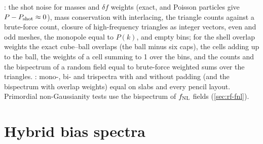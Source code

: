 \begin{validation}
: the shot noise for masses and $\delta f$ weights (exact, and Poisson particles give $P-P_{\rm shot}\approx0$), mass
conservation with interlacing, the triangle counts against a brute-force count, closure of high-frequency triangles as integer vectors, even and odd
meshes, the monopole equal to $P(k)$, and empty bins; for the shell overlap weights the exact cube--ball overlaps (the ball minus six caps), the
cells adding up to the ball, the weights of a cell summing to 1 over the bins, and the counts and the bispectrum of a random field equal to brute-force
weighted sums over the triangles. : mono-, bi- and trispectra with and without padding (and the bispectrum with
overlap weights) equal on slabs and every pencil layout. Primordial non-Gaussianity tests use the bispectrum of $f_{\rm NL}$ fields (\cref{sec:rf-fnl}).
\end{validation}

\section{Hybrid bias spectra}\label{sec:pk-hybrid}

